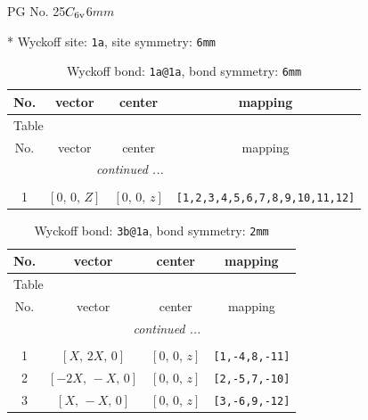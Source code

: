 \documentclass[fleqn,8pt]{jsarticle}
\begin{document}
\setcounter{MaxMatrixCols}{32}

\renewcommand{\tablename}{Table~}
\renewcommand{\figurename}{Figure~}
\begin{center}
\LARGE
PG No. 25\quad$C_{\rm 6v}$\quad$6mm$\quad[ hexagonal ]
\end{center}


* Wyckoff site: {\tt 1a}, site symmetry: {\tt 6mm}
\renewcommand{\arraystretch}{1.2}
\begin{longtable}{cccc}
\caption{Wyckoff bond: {\tt 1a@1a}, bond symmetry: {\tt 6mm}}
 \\
 \hline \hline
No. & vector & center & mapping \\ \hline \endfirsthead

\multicolumn{3}{l}{\tablename\ \thetable{}} \\
 \hline \hline
No. & vector & center & mapping \\ \hline \endhead

 \hline \hline
\multicolumn{3}{r}{\footnotesize\it continued ...} \\ \endfoot

 \hline \hline
\multicolumn{3}{r}{} \\ \endlastfoot

1 & $\left[ 0,\, 0,\, Z \right]$ & $\left[ 0,\, 0,\, z \right]$ & {\tt [1,2,3,4,5,6,7,8,9,10,11,12]} \\
\end{longtable}
\renewcommand{\arraystretch}{1.2}
\begin{longtable}{cccc}
\caption{Wyckoff bond: {\tt 3b@1a}, bond symmetry: {\tt 2mm}}
 \\
 \hline \hline
No. & vector & center & mapping \\ \hline \endfirsthead

\multicolumn{3}{l}{\tablename\ \thetable{}} \\
 \hline \hline
No. & vector & center & mapping \\ \hline \endhead

 \hline \hline
\multicolumn{3}{r}{\footnotesize\it continued ...} \\ \endfoot

 \hline \hline
\multicolumn{3}{r}{} \\ \endlastfoot

1 & $\left[ X,\, 2 X,\, 0 \right]$ & $\left[ 0,\, 0,\, z \right]$ & {\tt [1,-4,8,-11]} \\ \hline
2 & $\left[ - 2 X,\, - X,\, 0 \right]$ & $\left[ 0,\, 0,\, z \right]$ & {\tt [2,-5,7,-10]} \\ \hline
3 & $\left[ X,\, - X,\, 0 \right]$ & $\left[ 0,\, 0,\, z \right]$ & {\tt [3,-6,9,-12]} \\
\end{longtable}
\end{document}
